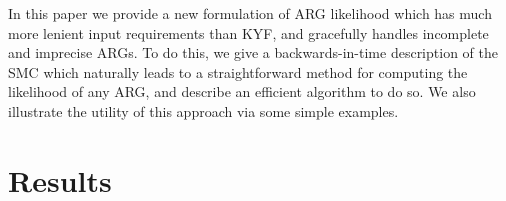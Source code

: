 \documentclass{article}
\begin{document}
In this paper we provide a new formulation of ARG likelihood which 
has much more lenient input requirements than KYF, and gracefully handles
incomplete and imprecise ARGs.
To do this, we give a backwards-in-time description of the SMC
which naturally leads to a straightforward method for computing the likelihood
of any ARG, and describe an efficient algorithm to do so.
We also illustrate the utility of this approach via some simple examples.

\section*{Results}



\end{document}
